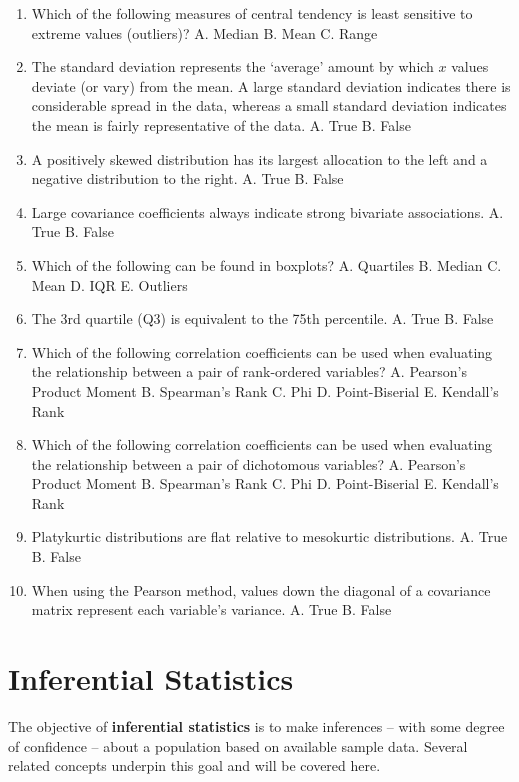 \documentclass[]{book}
\begin{document}
\begin{enumerate}
\def\labelenumi{\arabic{enumi}.}
\item
  Which of the following measures of central tendency is least sensitive to extreme values (outliers)?
  A. Median
  B. Mean
  C. Range
\item
  The standard deviation represents the `average' amount by which \(x\) values deviate (or vary) from the mean. A large standard deviation indicates there is considerable spread in the data, whereas a small standard deviation indicates the mean is fairly representative of the data.
  A. True
  B. False
\item
  A positively skewed distribution has its largest allocation to the left and a negative distribution to the right.
  A. True
  B. False
\item
  Large covariance coefficients always indicate strong bivariate associations.
  A. True
  B. False
\item
  Which of the following can be found in boxplots?
  A. Quartiles
  B. Median
  C. Mean
  D. IQR
  E. Outliers
\item
  The 3rd quartile (Q3) is equivalent to the 75th percentile.
  A. True
  B. False
\item
  Which of the following correlation coefficients can be used when evaluating the relationship between a pair of rank-ordered variables?
  A. Pearson's Product Moment
  B. Spearman's Rank
  C. Phi
  D. Point-Biserial
  E. Kendall's Rank
\item
  Which of the following correlation coefficients can be used when evaluating the relationship between a pair of dichotomous variables?
  A. Pearson's Product Moment
  B. Spearman's Rank
  C. Phi
  D. Point-Biserial
  E. Kendall's Rank
\item
  Platykurtic distributions are flat relative to mesokurtic distributions.
  A. True
  B. False
\item
  When using the Pearson method, values down the diagonal of a covariance matrix represent each variable's variance.
  A. True
  B. False
\end{enumerate}

\hypertarget{inf-stats}{%
\chapter{Inferential Statistics}\label{inf-stats}}

The objective of \textbf{inferential statistics} is to make inferences -- with some degree of confidence -- about a population based on available sample data. Several related concepts underpin this goal and will be covered here.
\end{document}

